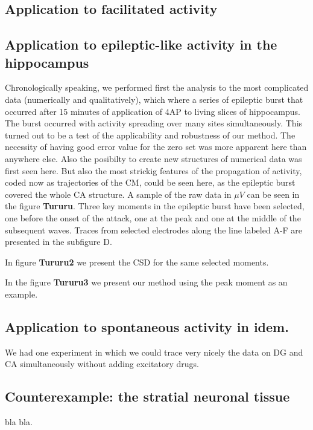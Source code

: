 \documentclass[12pt]{article}
\begin{document}
\subsection{Application to facilitated activity}


\subsection{Application to epileptic-like activity in the hippocampus}
Chronologically speaking, we performed first the analysis to the most complicated data (numerically and qualitatively), which where a series of epileptic burst that occurred after 15 minutes of application of 4AP to living slices of hippocampus. The burst occurred with activity spreading over many sites simultaneously. This turned out to be a test of the applicability and robustness of our method. The necessity of having good error value for the zero set was more apparent here than anywhere else. Also the posibilty to create new structures of numerical data was first seen here.  But also the most strickig features of the propagation of activity, coded now as trajectories of the CM, could be seen here, as the epileptic burst covered the whole CA structure. A sample of the raw data in $\mu V$ can be seen in the figure \textbf{Tururu}. Three key moments in the epileptic burst have been selected, one before the onset of the attack, one at the peak and one at the middle of the subsequent waves. Traces from selected electrodes along the line labeled A-F are presented in the subfigure D. 

In figure \textbf{Tururu2} we present the CSD for the same selected moments.

In the figure \textbf{Tururu3} we present our method using the peak moment as an example. 

\subsection{Application to spontaneous activity in idem.}

We had one experiment in which we could trace very nicely the data on DG and CA simultaneously without adding excitatory drugs. 

\subsection{Counterexample: the stratial neuronal tissue}

bla bla.


 
\end{document}
